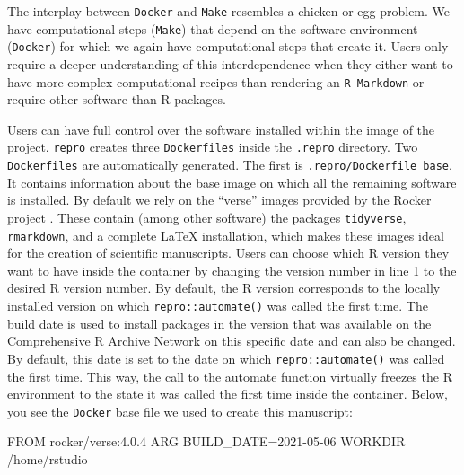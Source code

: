 \documentclass[psych,tutorial,submit,moreauthors,pdftex]{mdpi}
\newenvironment{Shaded}{\begin{snugshade}}{\end{snugshade}}
\newcommand{\ExtensionTok}[1]{#1}
\newcommand{\NormalTok}[1]{#1}
\begin{document}
The interplay between \texttt{Docker} and \texttt{Make} resembles a
chicken or egg problem. We have computational steps (\texttt{Make}) that
depend on the software environment (\texttt{Docker}) for which we again
have computational steps that create it. Users only require a deeper
understanding of this interdependence when they either want to have more
complex computational recipes than rendering an \texttt{R\ Markdown} or
require other software than R packages.

Users can have full control over the software installed within the image
of the project. \texttt{repro} creates three \texttt{Dockerfiles} inside
the \texttt{.repro} directory. Two \texttt{Dockerfiles} are
automatically generated. The first is \texttt{.repro/Dockerfile\_base}.
It contains information about the base image on which all the remaining
software is installed. By default we rely on the ``verse'' images
provided by the Rocker project
\citep{boettigerIntroductionRockerDocker2017}. These contain (among
other software) the packages \texttt{tidyverse}, \texttt{rmarkdown}, and
a complete LaTeX installation, which makes these images ideal for the
creation of scientific manuscripts. Users can choose which R version
they want to have inside the container by changing the version number in
line 1 to the desired R version number. By default, the R version
corresponds to the locally installed version on which
\texttt{repro::automate()} was called the first time. The build date is
used to install packages in the version that was available on the
Comprehensive R Archive Network on this specific date and can also be
changed. By default, this date is set to the date on which
\texttt{repro::automate()} was called the first time. This way, the call
to the automate function virtually freezes the R environment to the
state it was called the first time inside the container. Below, you see
the \texttt{Docker} base file we used to create this manuscript:

\begin{Shaded}
\begin{Highlighting}[]
\ExtensionTok{FROM}\NormalTok{ rocker/verse:4.0.4}
\ExtensionTok{ARG}\NormalTok{ BUILD\_DATE=2021{-}05{-}06}
\ExtensionTok{WORKDIR}\NormalTok{ /home/rstudio}
\end{Highlighting}
\end{Shaded}
\end{document}
